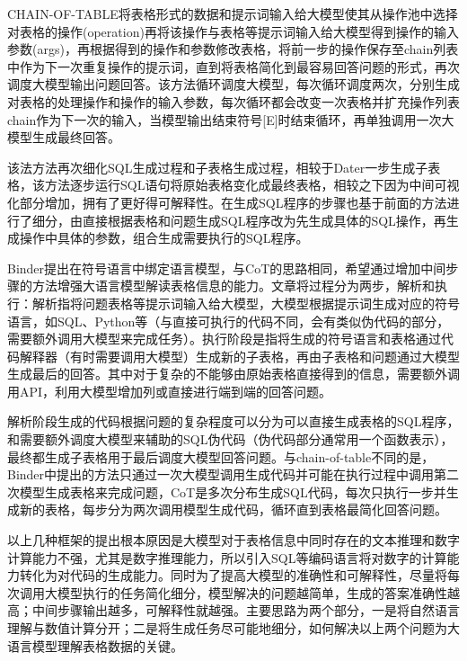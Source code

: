 CHAIN-OF-TABLE\cite{wangChainofTableEvolvingTables2024}将表格形式的数据和提示词输入给大模型使其从操作池中选择对表格的操作(operation)再将该操作与表格等提示词输入给大模型得到操作的输入参数(args)，再根据得到的操作和参数修改表格，将前一步的操作保存至chain列表中作为下一次重复操作的提示词，直到将表格简化到最容易回答问题的形式，再次调度大模型输出问题回答。该方法循环调度大模型，每次循环调度两次，分别生成对表格的处理操作和操作的输入参数，每次循环都会改变一次表格并扩充操作列表chain作为下一次的输入，当模型输出结束符号[E]时结束循环，再单独调用一次大模型生成最终回答。

该法方法再次细化SQL生成过程和子表格生成过程，相较于Dater\cite{yeLargeLanguageModels2023}一步生成子表格，该方法逐步运行SQL语句将原始表格变化成最终表格，相较之下因为中间可视化部分增加，拥有了更好得可解释性。在生成SQL程序的步骤也基于前面的方法进行了细分，由直接根据表格和问题生成SQL程序改为先生成具体的SQL操作，再生成操作中具体的参数，组合生成需要执行的SQL程序。

Binder\cite{chengBindingLanguageModels2023}提出在符号语言中绑定语言模型，与CoT\cite{wangChainofTableEvolvingTables2024}的思路相同，希望通过增加中间步骤的方法增强大语言模型解读表格信息的能力。文章将过程分为两步，解析和执行：解析指将问题表格等提示词输入给大模型，大模型根据提示词生成对应的符号语言，如SQL、Python等（与直接可执行的代码不同，会有类似伪代码的部分，需要额外调用大模型来完成任务）。执行阶段是指将生成的符号语言和表格通过代码解释器（有时需要调用大模型）生成新的子表格，再由子表格和问题通过大模型生成最后的回答。其中对于复杂的不能够由原始表格直接得到的信息，需要额外调用API，利用大模型增加列或直接进行端到端的回答问题。

解析阶段生成的代码根据问题的复杂程度可以分为可以直接生成表格的SQL程序，和需要额外调度大模型来辅助的SQL伪代码（伪代码部分通常用一个函数表示），最终都生成子表格用于最后调度大模型回答问题。与chain-of-table\cite{wangChainofTableEvolvingTables2024}不同的是，Binder中提出的方法只通过一次大模型调用生成代码并可能在执行过程中调用第二次模型生成表格来完成问题，CoT\cite{wangChainofTableEvolvingTables2024}是多次分布生成SQL代码，每次只执行一步并生成新的表格，每步分为两次调用模型生成代码，循环直到表格最简化回答问题。

以上几种框架的提出根本原因是大模型对于表格信息中同时存在的文本推理和数字计算能力不强，尤其是数字推理能力，所以引入SQL等编码语言将对数字的计算能力转化为对代码的生成能力。同时为了提高大模型的准确性和可解释性，尽量将每次调用大模型执行的任务简化细分，模型解决的问题越简单，生成的答案准确性越高；中间步骤输出越多，可解释性就越强。主要思路为两个部分，一是将自然语言理解与数值计算分开；二是将生成任务尽可能地细分，如何解决以上两个问题为大语言模型理解表格数据的关键。

